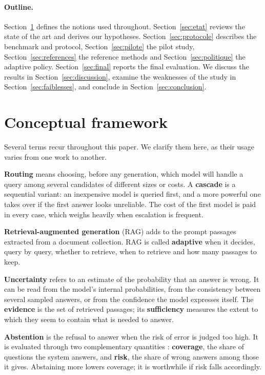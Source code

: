 \documentclass[11pt,a4paper]{article}
\begin{document}
\paragraph{Outline.} Section~\ref{sec:cadre} defines the notions used throughout. Section~\ref{sec:etat}
reviews the state of the art and derives our hypotheses. Section~\ref{sec:protocole} describes the
benchmark and protocol, Section~\ref{sec:pilote} the pilot study, Section~\ref{sec:references} the
reference methods and Section~\ref{sec:politique} the adaptive policy. Section~\ref{sec:final} reports
the final evaluation. We discuss the results in Section~\ref{sec:discussion}, examine the weaknesses of
the study in Section~\ref{sec:faiblesses}, and conclude in Section~\ref{sec:conclusion}.

\section{Conceptual framework}\label{sec:cadre}

Several terms recur throughout this paper. We clarify them here, as their usage varies from one work to
another.

\textbf{Routing} means choosing, before any generation, which model will handle a query among several
candidates of different sizes or costs. A \textbf{cascade} is a sequential variant: an inexpensive model
is queried first, and a more powerful one takes over if the first answer looks unreliable. The cost of
the first model is paid in every case, which weighs heavily when escalation is frequent.

\textbf{Retrieval-augmented generation} (RAG) adds to the prompt passages extracted from a document
collection. RAG is called \textbf{adaptive} when it decides, query by query, whether to retrieve, when
to retrieve and how many passages to keep.

\textbf{Uncertainty} refers to an estimate of the probability that an answer is wrong. It can be read
from the model's internal probabilities, from the consistency between several sampled answers, or from
the confidence the model expresses itself. The \textbf{evidence} is the set of retrieved passages; its
\textbf{sufficiency} measures the extent to which they seem to contain what is needed to answer.

\textbf{Abstention} is the refusal to answer when the risk of error is judged too high. It is evaluated
through two complementary quantities \citep{kamath2020selective}: \textbf{coverage}, the share of
questions the system answers, and \textbf{risk}, the share of wrong answers among those it gives.
Abstaining more lowers coverage; it is worthwhile if risk falls accordingly.
\end{document}

